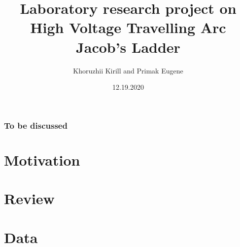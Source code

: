 \documentclass{beamer}
\title[Jacob's Ladder]{ Laboratory  research project on  \\ High Voltage Travelling Arc \\
Jacob's Ladder}
\author{Khoruzhii Kirill and Primak Eugene}
\institute[MIPT]
\begin{document}
\date{12.19.2020}
\maketitle

\begin{frame}
\frametitle{To be discussed}
\tableofcontents
\end{frame}

\section{Motivation}

\section{Review}




\section{Data}
\frame{}





\end{document}
